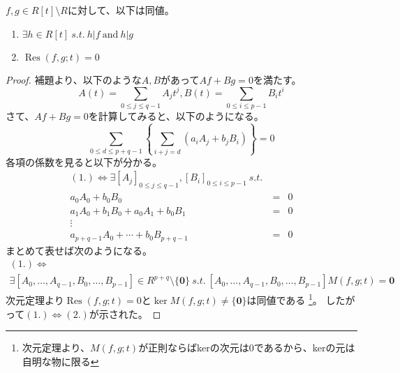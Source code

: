 \documentclass[a4paper]{jsarticle}
\newcommand{\Res}{\operatorname{Res}}
\begin{document}
    \begin{Them}
        $f,g \in R[t] \setminus R$に対して、以下は同値。
        \begin{enumerate}
            \item $\exists h \in R[t]~s.t.~ h|f~\mbox{and}~h|g$
            \item $\Res(f,g; t)=0$
        \end{enumerate}
    \end{Them}
    \begin{proof}
        補題より、以下のような$A,B$があって$Af+Bg=0$を満たす。
        \[ A(t)=\sum_{0 \leq j \leq q-1}{A_{j}t^{j}},B(t)=\sum_{0 \leq i \leq p-1}{B_{i}t^{i}} \]
        さて、$Af+Bg=0$を計算してみると、以下のようになる。
        \[ \sum_{0 \leq d \leq p+q-1}{ \left\{ \sum_{i+j=d}{(a_i A_j + b_j B_i)} \right\}}=0 \]
        各項の係数を見ると以下が分かる。
        \begin{eqnarray*}
        (1.) \iff
        \exists [A_j]_{0 \leq j \leq q-1}, [B_i]_{0 \leq i \leq p-1} ~s.t.~ \\
        a_0 A_0 + b_0 B_0 &=&0 \\
        a_1 A_0 + b_1 B_0+a_0 A_1 + b_0 B_1&=&0 \\
        \vdots \\
        a_{p+q-1} A_0 + \cdots + b_0 B_{p+q-1}&=&0
        \end{eqnarray*}
        まとめて表せば次のようになる。
        \begin{gather*}
            (1.) \iff \\
            \exists [A_0, \dots, A_{q-1}, B_0, \dots, B_{p-1}] \in R^{p+q} \setminus \{ \mathbf{0} \} ~s.t.~
            [A_0, \dots, A_{q-1}, B_0, \dots, B_{p-1}] M(f,g;t)=\mathbf{0}
        \end{gather*}
        次元定理より$\Res(f,g;t)=0$と$\operatorname{ker}M(f,g;t) \neq \{ \mathbf{0} \}$は同値である
        \footnote{次元定理より、$M(f,g;t)$が正則ならばkerの次元は0であるから、kerの元は自明な物に限る}。
        したがって$(1.) \iff (2.)$が示された。
        
    \end{proof}
\end{document}
